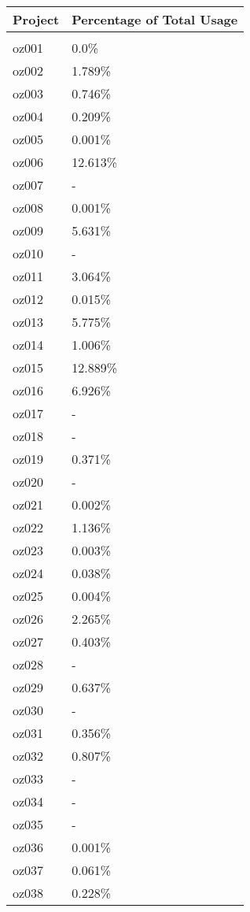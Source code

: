 \documentclass{article}%
\begin{document}
%
\begin{longtabu}{X[l] X[r]}%
\textbf{Project}&\textbf{Percentage of Total Usage}\\%
\hline%
&\\%
oz001&0.0\%\\%
\hline%
oz002&1.789\%\\%
\hline%
oz003&0.746\%\\%
\hline%
oz004&0.209\%\\%
\hline%
oz005&0.001\%\\%
\hline%
oz006&12.613\%\\%
\hline%
oz007&{-}\\%
\hline%
oz008&0.001\%\\%
\hline%
oz009&5.631\%\\%
\hline%
oz010&{-}\\%
\hline%
oz011&3.064\%\\%
\hline%
oz012&0.015\%\\%
\hline%
oz013&5.775\%\\%
\hline%
oz014&1.006\%\\%
\hline%
oz015&12.889\%\\%
\hline%
oz016&6.926\%\\%
\hline%
oz017&{-}\\%
\hline%
oz018&{-}\\%
\hline%
oz019&0.371\%\\%
\hline%
oz020&{-}\\%
\hline%
oz021&0.002\%\\%
\hline%
oz022&1.136\%\\%
\hline%
oz023&0.003\%\\%
\hline%
oz024&0.038\%\\%
\hline%
oz025&0.004\%\\%
\hline%
oz026&2.265\%\\%
\hline%
oz027&0.403\%\\%
\hline%
oz028&{-}\\%
\hline%
oz029&0.637\%\\%
\hline%
oz030&{-}\\%
\hline%
oz031&0.356\%\\%
\hline%
oz032&0.807\%\\%
\hline%
oz033&{-}\\%
\hline%
oz034&{-}\\%
\hline%
oz035&{-}\\%
\hline%
oz036&0.001\%\\%
\hline%
oz037&0.061\%\\%
\hline%
oz038&0.228\%\\%

\end{longtabu}
\end{document}
